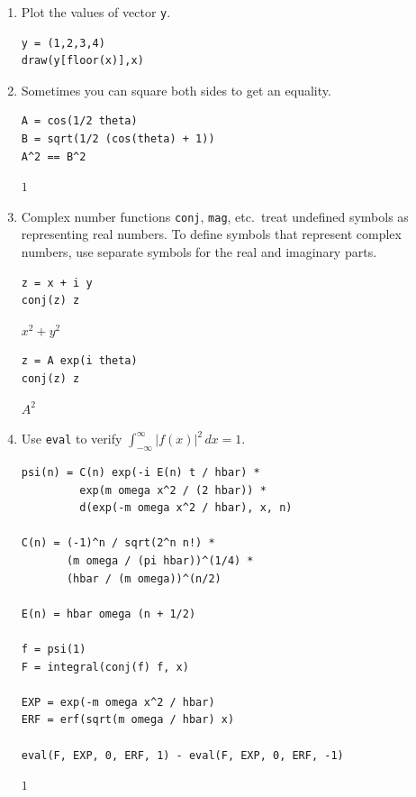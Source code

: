 \documentclass[12pt]{article}
\begin{document}
\begin{enumerate}
$\frac{1}{2}\cos(\theta)+\frac{1}{2}$

\item
Plot the values of vector \verb$y$.

{\color{blue}
\begin{verbatim}
y = (1,2,3,4)
draw(y[floor(x)],x)
\end{verbatim}}

\newpage

\item
Sometimes you can square both sides to get an equality.
{\color{blue}
\begin{verbatim}
A = cos(1/2 theta)
B = sqrt(1/2 (cos(theta) + 1))
A^2 == B^2
\end{verbatim}}

$1$

\item
Complex number functions \verb$conj$, \verb$mag$, etc.~treat undefined symbols as
representing real numbers.
To define symbols that represent complex numbers, use separate symbols for the
real and imaginary parts.

{\color{blue}
\begin{verbatim}
z = x + i y
conj(z) z
\end{verbatim}}

$x^2+y^2$

{\color{blue}
\begin{verbatim}
z = A exp(i theta)
conj(z) z
\end{verbatim}}

$A^2$

\item
Use \verb$eval$ to verify
$\int_{-\infty}^\infty|f(x)|^2\,dx=1$.

{\color{blue}
\begin{verbatim}
psi(n) = C(n) exp(-i E(n) t / hbar) *
         exp(m omega x^2 / (2 hbar)) *
         d(exp(-m omega x^2 / hbar), x, n)

C(n) = (-1)^n / sqrt(2^n n!) *
       (m omega / (pi hbar))^(1/4) *
       (hbar / (m omega))^(n/2)

E(n) = hbar omega (n + 1/2)

f = psi(1)
F = integral(conj(f) f, x)

EXP = exp(-m omega x^2 / hbar)
ERF = erf(sqrt(m omega / hbar) x)

eval(F, EXP, 0, ERF, 1) - eval(F, EXP, 0, ERF, -1)
\end{verbatim}}

$1$

\newpage


\end{enumerate}
\end{document}
